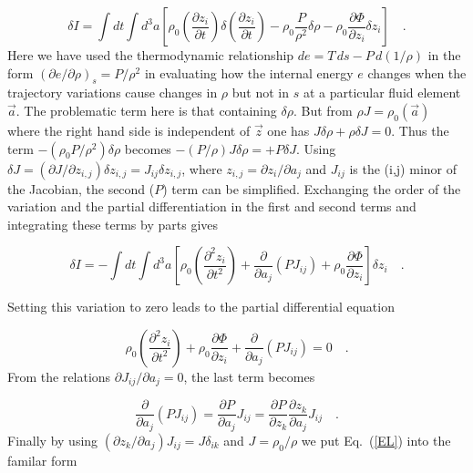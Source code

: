 \documentclass{article}
\def\a{{\vec a}}
\def\z{{\vec z}}
\def\.{{\quad .}}
\begin{document}
\begin{equation}
    \delta I = \int\!\! dt \int\!\! d^3a \left[ \rho_0
    \left(\frac{\partial z_i}{\partial t}\right)\delta
    \left(\frac{\partial z_i}{\partial t} \right)
    - \rho_0 \frac{P}{\rho^2} \delta \rho
    - \rho_0 \frac{\partial \Phi}{\partial z_i} \delta {z_i}
    \right] \.
\end{equation}
%
Here we have used the thermodynamic relationship $de = T\,ds -P\,d(1/\rho)$ in
the form $(\partial e/\partial \rho)_s = P/\rho^2$ in evaluating how the
internal energy $e$ changes when the trajectory variations cause changes in
$\rho$ but not in $s$ at a particular fluid element $\a$.  The problematic
term here is that containing $\delta \rho$.  But from $\rho J = \rho_0(\a)$
where the right hand side is independent of $\z$ one has
$J \delta \rho + \rho \delta J = 0$.  Thus the term
$-(\rho_0 {P}/{\rho^2}) \delta \rho$ becomes
$-(P/\rho) J \delta \rho = + P \delta J$.  Using $\delta J = ({\partial J}/
{\partial z_{i,j}}) \delta z_{i,j} = J_{ij} \delta z_{i,j}$,
where $z_{i,j} = {\partial z_i}/{\partial a_j}$ and $J_{ij}$ is the (i,j)
minor of the Jacobian, the second ($P$) term can be simplified.  Exchanging
the order of the variation and the partial differentiation in the first and
second terms and integrating these terms by parts gives

\begin{equation}
    \delta I = -\int\!\! dt \int\!\! d^3a \left[ \rho_0
    \left(\frac{\partial^2 z_i}{\partial t^2}\right)
    + \frac{\partial}{\partial
    a_j}\left(P J_{ij}\right)
    + \rho_0 \frac{\partial \Phi}{\partial z_i}
    \right] \delta z_i \.
\end{equation}

Setting this variation to zero leads to the partial differential equation

\begin{equation}\label{EL}
    \rho_0 \left(\frac{\partial^2 z_i}{\partial t^2}\right) + \rho_0
    \frac{\partial \Phi}{\partial z_i} + \frac{\partial}{\partial
    a_j}\left(P J_{ij}\right) = 0 \.
\end{equation}
%
From the relations ${\partial J_{ij}}/{\partial a_j} = 0$, the last term becomes

\begin{equation}
    \frac{\partial}{\partial a_j}\left(P  J_{ij} \right) =
    \frac{\partial P}{\partial a_j} J_{ij} = \frac{\partial P}{\partial
    z_k}\frac{\partial z_k}{\partial a_j} J_{ij} \.
\end{equation}
%
Finally by using $({\partial z_k}/{\partial a_j}) J_{ij} = J \delta_{ik}$ and
$J = \rho_0 / \rho$ we put Eq.~(\ref{EL}) into the familar form
\end{document}
